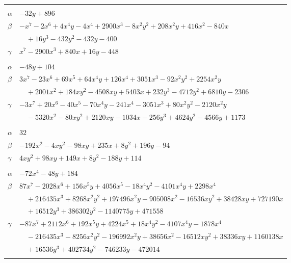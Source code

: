 \documentclass[11pt]{article}
\begin{document}
\begin{longtable}{@{}ll@{}}
\addlinespace[3pt]
\multicolumn{2}{@{}l}{$\{i,j\}=\{89,108\}$, $k_{ij}=2^{5}\cdot 3^{4}$}\\
$\alpha$ & $-32y+896$\\
$\beta$ & $-x^{7}-2x^{6}+4x^{4}y-4x^{4}+2900x^{3}-8x^{2}y^{2}+208x^{2}y+416x^{2}-840x$\\
 & $\quad +16y^{3}-432y^{2}-432y-400$\\
$\gamma$ & $x^{7}-2900x^{3}+840x+16y-448$\\
\addlinespace[3pt]
\multicolumn{2}{@{}l}{$\{i,j\}=\{92,94\}$, $k_{ij}=2^{4}\cdot 3^{2}$}\\
$\alpha$ & $-48y+104$\\
$\beta$ & $3x^{7}-23x^{6}+69x^{5}+64x^{4}y+126x^{4}+3051x^{3}-92x^{2}y^{2}+2254x^{2}y$\\
 & $\quad +2001x^{2}+184xy^{2}-4508xy+5403x+232y^{3}-4712y^{2}+6810y-2306$\\
$\gamma$ & $-3x^{7}+20x^{6}-40x^{5}-70x^{4}y-241x^{4}-3051x^{3}+80x^{2}y^{2}-2120x^{2}y$\\
 & $\quad -5320x^{2}-80xy^{2}+2120xy-1034x-256y^{3}+4624y^{2}-4566y+1173$\\
\addlinespace[3pt]
\multicolumn{2}{@{}l}{$\{i,j\}=\{92,98\}$, $k_{ij}=2^{2}\cdot 13$}\\
$\alpha$ & $32$\\
$\beta$ & $-192x^{2}-4xy^{2}-98xy+235x+8y^{2}+196y-94$\\
$\gamma$ & $4xy^{2}+98xy+149x+8y^{2}-188y+114$\\
\addlinespace[3pt]
\multicolumn{2}{@{}l}{$\{i,j\}=\{93,99\}$, $k_{ij}=2^{7}\cdot 5$}\\
$\alpha$ & $-72x^{4}-48y+184$\\
$\beta$ & $87x^{7}-2028x^{6}+156x^{5}y+4056x^{5}-18x^{4}y^{2}-4101x^{4}y+2298x^{4}$\\
 & $\quad +216435x^{3}+8268x^{2}y^{2}+197496x^{2}y-905008x^{2}-16536xy^{2}+38428xy+727190x$\\
 & $\quad +16512y^{3}+386302y^{2}-1140775y+471558$\\
$\gamma$ & $-87x^{7}+2112x^{6}+192x^{5}y+4224x^{5}+18x^{4}y^{2}-4107x^{4}y-1878x^{4}$\\
 & $\quad -216435x^{3}-8256x^{2}y^{2}-196992x^{2}y+38656x^{2}-16512xy^{2}+38336xy+1160138x$\\
 & $\quad +16536y^{3}+402734y^{2}-746233y-472014$\\
\addlinespace[3pt]
\multicolumn{2}{@{}l}{$\{i,j\}=\{94,97\}$, $k_{ij}=2^{8}\cdot 3^{2}\cdot 5\cdot 7$}\\

\end{longtable}
\end{document}
